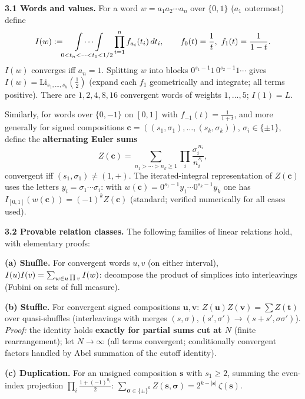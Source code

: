 \documentclass[11pt]{article}
\theoremstyle{remark}
\newcommand{\shuffle}{\mathbin{\rotatebox[origin=c]{180}{\ensuremath{\amalg}}}}
\begin{document}
\textbf{3.1 Words and values.} For a word $w=a_1a_2\cdots a_n$ over $\{0,1\}$ ($a_1$ outermost) define
\[
I(w):=\idotsint\limits_{0<t_n<\cdots<t_1<1/2}\prod_{i=1}^n f_{a_i}(t_i)\,dt_i,\qquad f_0(t)=\frac1t,\ f_1(t)=\frac1{1-t}.
\]
$I(w)$ converges iff $a_n=1$. Splitting $w$ into blocks $0^{s_1-1}1\,0^{s_2-1}1\cdots$ gives
$I(w)=\mathrm{Li}_{s_1,\dots,s_k}(\tfrac12)$ (expand each $f_1$ geometrically and integrate; all terms positive). There are $1,2,4,8,16$ convergent words of weights $1,\dots,5$; $I(1)=L$.

Similarly, for words over $\{0,-1\}$ on $[0,1]$ with $f_{-1}(t)=\frac1{1+t}$, and more generally for signed compositions $\mathbf c=((s_1,\sigma_1),\dots,(s_k,\sigma_k))$, $\sigma_i\in\{\pm1\}$, define the \textbf{alternating Euler sums}
\[
Z(\mathbf c)=\sum_{n_1>\cdots>n_k\ge1}\prod_i\frac{\sigma_i^{\,n_i}}{n_i^{s_i}},
\]
convergent iff $(s_1,\sigma_1)\ne(1,+)$. The iterated-integral representation of $Z(\mathbf c)$ uses the letters $y_i=\sigma_1\cdots\sigma_i$: with $w(\mathbf c)=0^{s_1-1}y_1\cdots0^{s_k-1}y_k$ one has $I_{[0,1]}(w(\mathbf c))=(-1)^kZ(\mathbf c)$ (standard; verified numerically for all cases used).

\textbf{3.2 Provable relation classes.} The following families of linear relations hold, with elementary proofs:

\textbf{(a) Shuffle.} For convergent words $u,v$ (on either interval),
$I(u)I(v)=\sum_{w\in u\,\shuffle\,v}I(w)$: decompose the product of simplices into interleavings (Fubini on sets of full measure).

\textbf{(b) Stuffle.} For convergent signed compositions $\mathbf u,\mathbf v$:
$Z(\mathbf u)Z(\mathbf v)=\sum Z(\mathbf t)$ over quasi-shuffles (interleavings with merges $(s,\sigma),(s',\sigma')\to(s+s',\sigma\sigma')$). \textit{Proof:} the identity holds \textbf{exactly for partial sums cut at $N$} (finite rearrangement); let $N\to\infty$ (all terms convergent; conditionally convergent factors handled by Abel summation of the cutoff identity).

\textbf{(c) Duplication.} For an unsigned composition $\mathbf s$ with $s_1\ge2$, summing the even-index projection $\prod_i\frac{1+(-1)^{n_i}}2$:
$\sum_{\boldsymbol\sigma\in\{\pm\}^k}Z(\mathbf s,\boldsymbol\sigma)=2^{k-|\mathbf s|}\,\zeta(\mathbf s)$.
\end{document}

